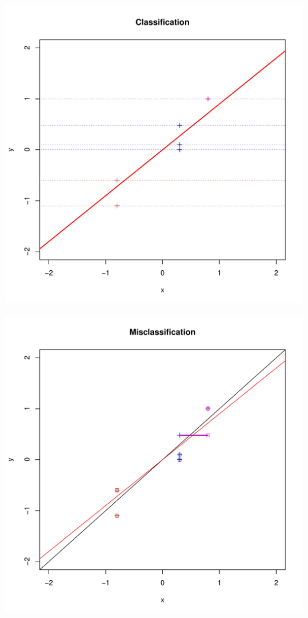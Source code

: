 \documentclass{beamer}
\begin{document}
\begin{frame}
\begin{center}
\includegraphics[scale = 0.4]{ti8.pdf}
\end{center}
\end{frame}

\begin{frame}
\begin{center}
\includegraphics[scale = 0.4]{ti9.pdf}
\end{center}
\end{frame}
\end{document}

